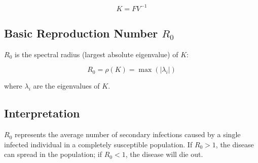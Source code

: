 \documentclass[11pt]{article}
\begin{document}
\begin{equation*}
K = F V^{-1}
\end{equation*}

\subsection{Basic Reproduction Number $R_0$}

$R_0$ is the spectral radius (largest absolute eigenvalue) of $K$:

\begin{equation*}
R_0 = \rho(K) = \max(|\lambda_i|)
\end{equation*}

where $\lambda_i$ are the eigenvalues of $K$.

\subsection{Interpretation}

$R_0$ represents the average number of secondary infections caused by a single infected individual in a completely susceptible population. If $R_0 > 1$, the disease can spread in the population; if $R_0 < 1$, the disease will die out.
\end{document}

